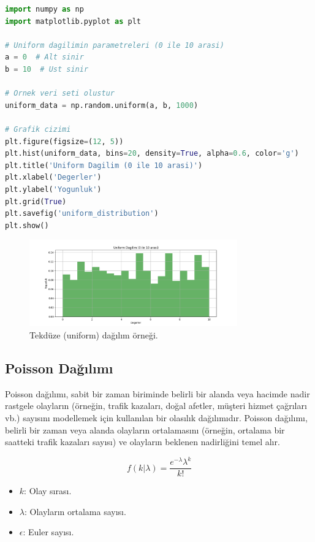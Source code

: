 \begin{lstlisting}[language=Python]
import numpy as np
import matplotlib.pyplot as plt

# Uniform dagilimin parametreleri (0 ile 10 arasi)
a = 0  # Alt sinir
b = 10  # Ust sinir

# Ornek veri seti olustur
uniform_data = np.random.uniform(a, b, 1000)

# Grafik cizimi
plt.figure(figsize=(12, 5))
plt.hist(uniform_data, bins=20, density=True, alpha=0.6, color='g')
plt.title('Uniform Dagilim (0 ile 10 arasi)')
plt.xlabel('Degerler')
plt.ylabel('Yogunluk')
plt.grid(True)
plt.savefig('uniform_distribution')
plt.show()
\end{lstlisting}

\begin{figure}[h]
    \centering
    \includegraphics[width=0.8\textwidth]{images/uniform_distribution.png}
    \caption{Tekdüze (uniform) dağılım örneği.}
    \label{fig:enter-label}
\end{figure}


\subsection{Poisson Dağılımı}
Poisson dağılımı, sabit bir zaman biriminde belirli bir alanda veya hacimde nadir rastgele olayların (örneğin, trafik kazaları, doğal afetler, müşteri hizmet çağrıları vb.) sayısını modellemek için kullanılan bir olasılık dağılımıdır. Poisson dağılımı, belirli bir zaman veya alanda olayların ortalamasını (örneğin, ortalama bir saatteki trafik kazaları sayısı) ve olayların beklenen nadirliğini temel alır.

\[f(k|\lambda) = \frac{e^{-\lambda} \lambda^k}{k!}\]
\begin{itemize}
	\item $k$: Olay sırası.
	\item $\lambda$: Olayların ortalama sayısı.
	\item $\epsilon$: Euler sayısı.
\end{itemize}

